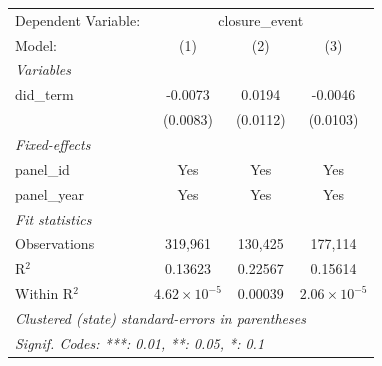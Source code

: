 
\begingroup
\centering
\begin{tabular}{lccc}
   \tabularnewline \midrule \midrule
   Dependent Variable: & \multicolumn{3}{c}{closure\_event}\\
   Model:       & (1)                   & (2)      & (3)\\  
   \midrule
   \emph{Variables}\\
   did\_term    & -0.0073               & 0.0194   & -0.0046\\   
                & (0.0083)              & (0.0112) & (0.0103)\\   
   \midrule
   \emph{Fixed-effects}\\
   panel\_id    & Yes                   & Yes      & Yes\\  
   panel\_year  & Yes                   & Yes      & Yes\\  
   \midrule
   \emph{Fit statistics}\\
   Observations & 319,961               & 130,425  & 177,114\\  
   R$^2$        & 0.13623               & 0.22567  & 0.15614\\  
   Within R$^2$ & $4.62\times 10^{-5}$  & 0.00039  & $2.06\times 10^{-5}$\\   
   \midrule \midrule
   \multicolumn{4}{l}{\emph{Clustered (state) standard-errors in parentheses}}\\
   \multicolumn{4}{l}{\emph{Signif. Codes: ***: 0.01, **: 0.05, *: 0.1}}\\
\end{tabular}
\par\endgroup


